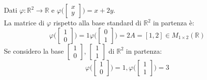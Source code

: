 \begin{example}
	Dati $\varphi: \mathbb{R}^2 \rightarrow \mathbb{R}$ e $\varphi \bigg( \begin{bmatrix}
		x \\ y
	\end{bmatrix}\bigg) = x + 2y$. \\
La matrice di $\varphi$ rispetto alla base standard di $\mathbb{R}^2$ in partenza è:
\begin{equation*}
	\varphi\bigg(\begin{bmatrix}
		1 \\ 0
	\end{bmatrix}\bigg) = 1
	\varphi\bigg(\begin{bmatrix}
		0 \\ 1
	\end{bmatrix}\bigg) = 2
	A = [1, 2] \in M_{1 \times 2}(\mathbb{R})
\end{equation*}
Se considero la base $\begin{bmatrix}
	1 \\ 0
\end{bmatrix}$, $\begin{bmatrix}
1 \\ 1
\end{bmatrix}$ di $\mathbb{R}^2$ in partenza:
\begin{equation*}
	\varphi\bigg(\begin{bmatrix}
		1 \\ 0
	\end{bmatrix}\bigg) = 1,
	\varphi\bigg(\begin{bmatrix}
		1 \\ 1
	\end{bmatrix}\bigg) = 3
\end{equation*}
\end{example}